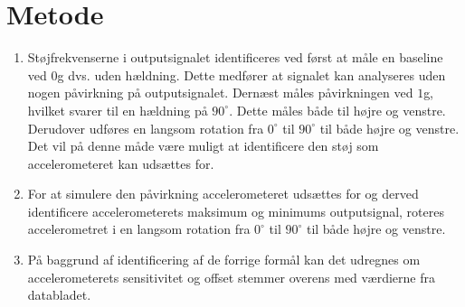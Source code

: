 \section{Metode}
\begin{enumerate} [label=\bfseries Formål \arabic*:]
\item Støjfrekvenserne i outputsignalet identificeres ved først at måle en baseline ved $0$g dvs. uden hældning. Dette medfører at signalet kan analyseres uden nogen påvirkning på outputsignalet. Dernæst måles  påvirkningen ved $1$g, hvilket svarer til en hældning på $90^{\circ}$. Dette måles både til højre og venstre. Derudover udføres en langsom rotation fra $0^{\circ}$ til $90^{\circ}$ til både højre og venstre. Det vil på denne måde være muligt at identificere den støj som accelerometeret kan udsættes for. %
\item For at simulere den påvirkning accelerometeret udsættes for og derved identificere accelerometerets maksimum og minimums outputsignal, roteres accelerometret i en langsom rotation fra $0^{\circ}$ til $90^{\circ}$ til både højre og venstre.
\item På baggrund af identificering af de forrige formål  kan det udregnes om accelerometerets sensitivitet og offset stemmer overens med værdierne fra databladet. \cite{Devices2009} 
\end{enumerate}

